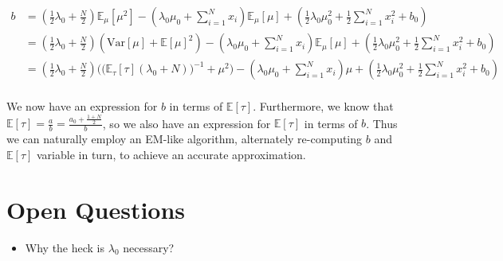 \documentclass[11pt]{article}
\begin{document}
\begin{align*}
b &= (\frac{1}{2}\lambda_0 + \frac{N}{2}) \mathbb{E}_\mu[\mu^2] - (\lambda_0\mu_0 + \sum_{i=1}^Nx_i) \mathbb{E}_\mu[\mu] + (\frac{1}{2}\lambda_0\mu_0^2 + \frac{1}{2}\sum_{i=1}^N x_i^2 + b_0) \\
&= (\frac{1}{2}\lambda_0 + \frac{N}{2}) (\text{Var}[\mu] + \mathbb{E}[\mu]^2) - (\lambda_0\mu_0 + \sum_{i=1}^Nx_i) \mathbb{E}_\mu[\mu] + (\frac{1}{2}\lambda_0\mu_0^2 + \frac{1}{2}\sum_{i=1}^N x_i^2 + b_0) \\
&= (\frac{1}{2}\lambda_0 + \frac{N}{2}) \Big(\big(\mathbb{E}_{\tau}[\tau](\lambda_0 + N) \big)^{-1} + \mu^2\Big) - (\lambda_0\mu_0 + \sum_{i=1}^Nx_i) \mu + (\frac{1}{2}\lambda_0\mu_0^2 + \frac{1}{2}\sum_{i=1}^N x_i^2 + b_0) \\
\end{align*}

We now have an expression for $b$ in terms of $\mathbb{E}[\tau]$.
Furthermore, we know that $\mathbb{E}[\tau] = \frac{a}{b} = \frac{a_0 + \frac{1 + N}{2}}{b}$,
so we also have an expression for $\mathbb{E}[\tau]$ in terms of $b$.
Thus we can naturally employ an EM-like algorithm, alternately re-computing $b$ and $\mathbb{E}[\tau]$ variable in turn, to achieve an accurate approximation.

\section{Open Questions}
\begin{itemize}
\item Why the heck is $\lambda_0$ necessary?
\end{itemize}
\end{document}

